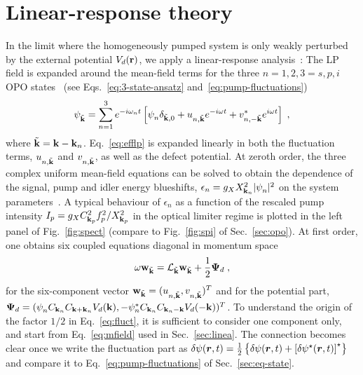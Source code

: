 \section{Linear-response theory}
\label{sec:line-resp-theory}
In the limit where the homogeneously pumped system is only weakly
perturbed by the external potential $V_d(\mathbf{r})$, we apply a
linear-response analysis~\cite{Astrakharchik_2004}: The LP field is
expanded around the mean-field terms for the three $n=1,2,3=s,p,i$ OPO
states~\cite{Whittaker_2005} (see Eqs.~\eqref{eq:3-state-ansatz}
and~\eqref{eq:pump-fluctuations})
%
\begin{equation}
  \psi_{\tilde{\mathbf{k}}}^{} = \sum_{n=1}^3 e^{-i \omega_n t}
  \left[\psi_{n}^{} \delta_{\tilde{\mathbf{k}},0} +
    u_{n,\tilde{\mathbf{k}}}^{} e^{-i\omega t} +
    v^*_{n,-\tilde{\mathbf{k}}} e^{i\omega t} \right]\; ,
\label{eq:expan}
\end{equation}
%
where $\tilde{\mathbf{k}} = \mathbf{k} - \mathbf{k}_n$. Eq.~\eqref{eq:efflp} is
expanded linearly in both the fluctuation terms,
$u_{n,\tilde{\mathbf{k}}}^{}$ and $v_{n,\tilde{\mathbf{k}}}^{}$, as well as
the defect potential.  At zeroth order, the three complex uniform
mean-field equations can be solved to obtain the dependence of the
signal, pump and idler energy blueshifts,
$\epsilon_n = g_X X^2_{\mathbf{k}_n} |\psi_{n}^{}|^2$ on the system
parameters~\cite{Wouters_2007_b}. A typical behaviour of $\epsilon_n$
as a function of the rescaled pump intensity
$I_p = g_X C_{\mathbf{k}_p}^2 f_p^2/X_{\mathbf{k}_p}^2$ in the optical limiter
regime is plotted in the left panel of Fig.~\ref{fig:spect} (compare
to Fig.~\ref{fig:spi} of Sec.~\ref{sec:opo}).
%
At first order, one obtains six coupled equations diagonal in momentum
space~\cite{Wouters_2007}
%
\begin{equation}
  \omega \mathbf{w}_{\tilde{\mathbf{k}}} = \mathcal{L}_{\tilde{\mathbf{k}}}
  \mathbf{w}_{\tilde{\mathbf{k}}} + \frac{1}{2} \bm{\Psi}_d\; ,
\label{eq:fluct}
\end{equation}
%
for the six-component vector
$\mathbf{w}_{\tilde{\mathbf{k}}} = (u_{n,\tilde{\mathbf{k}}}^{} ,
v_{n,\tilde{\mathbf{k}}}^{})^{T}$ and for the potential part,
$\bm{\Psi}_d = (\psi_n^{} C_{\mathbf{k}_n} C_{\mathbf{k} + \mathbf{k}_n}
V_d(\mathbf{k}),-\psi_n^* C_{\mathbf{k}_n} C_{\mathbf{k}_n - \mathbf{k}}
V_d(-\mathbf{k}))^{T}$. To understand the origin of the factor $1/2$ in
Eq.~\eqref{eq:fluct}, it is sufficient to consider one component only,
and start from Eq.~\eqref{eq:mfield} used in Sec.~\ref{sec:linea}. The
connection becomes clear once we write the fluctuation part as
$\delta\psi(\bm{r},t) = \frac{1}{2}\left\{\delta\psi(\bm{r},t)
  +\left[\delta\psi^{\star}(\bm{r},t)\right]^{\star}\right\}$ and compare
it to Eq.~\eqref{eq:pump-fluctuations} of Sec.~\ref{sec:eq-state}.

